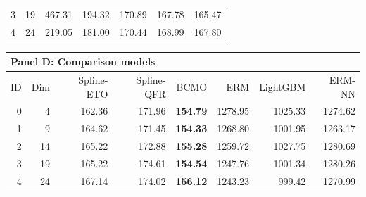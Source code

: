 \begin{table}[htbp]
\begin{tabular}{rrrrrrr}
3 & 19 & 467.31 & 194.32 & 170.89 & 167.78 & 165.47 \\
4 & 24 & 219.05 & 181.00 & 170.44 & 168.99 & 167.80 \\
\bottomrule
\end{tabular}
\par\medskip
\begin{tabular}{rrrrrrrr}
\toprule
\multicolumn{8}{l}{\textbf{Panel D: Comparison models}} \\
\midrule
ID & Dim & Spline-ETO & Spline-QFR & BCMO & ERM & LightGBM & ERM-NN \\
\midrule
0 & 4 & 162.36 & 171.96 & \textbf{154.79} & 1278.95 & 1025.33 & 1274.62 \\
1 & 9 & 164.62 & 171.45 & \textbf{154.33} & 1268.80 & 1001.95 & 1263.17 \\
2 & 14 & 165.22 & 172.88 & \textbf{155.28} & 1259.72 & 1027.75 & 1280.69 \\
3 & 19 & 165.22 & 174.61 & \textbf{154.54} & 1247.76 & 1001.34 & 1280.26 \\
4 & 24 & 167.14 & 174.02 & \textbf{156.12} & 1243.23 & 999.42 & 1270.99 \\
\bottomrule
\end{tabular}
\end{table}
